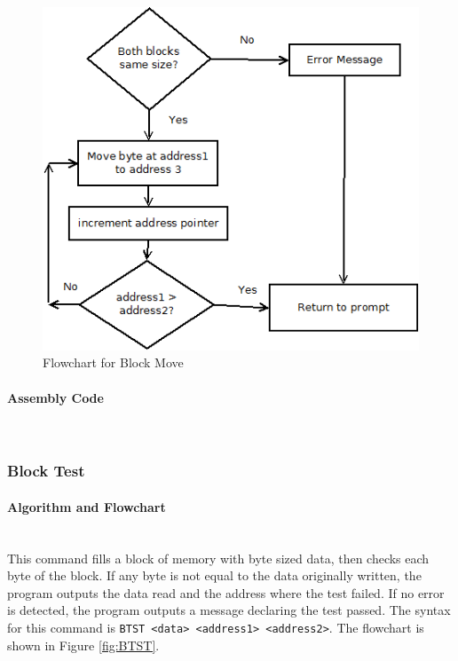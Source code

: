 \documentclass[12pt]{article}
\begin{document}
\begin{figure}[H]
\centering
\includegraphics[width=0.7\linewidth]{BMOV}
\caption{Flowchart for Block Move}
\label{fig:BMOV}
\end{figure}
			\paragraph{Assembly Code}~\\				
			
			\subsubsection{Block Test}
			\paragraph{Algorithm and Flowchart}~\\
			This command fills a block of memory with byte sized data, then checks each byte of the block. If any byte is not equal to the data originally written, the program outputs the data read and the address where the test failed. If no error is detected, the program outputs a message declaring the test passed. The syntax for this command is \texttt{BTST <data> <address1> <address2>}. The flowchart is shown in Figure \ref{fig:BTST}.
			
\end{document}
